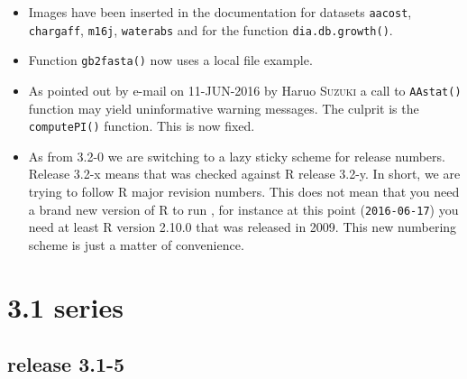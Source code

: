 \documentclass{article}
\begin{document}
\begin{itemize}

\item Images have been inserted in the documentation for datasets
\texttt{aacost}, \texttt{chargaff}, \texttt{m16j}, \texttt{waterabs} 
and for the function \texttt{dia.db.growth()}.

\item Function \texttt{gb2fasta()} now uses a local file example.

\item As pointed out by e-mail on 11-JUN-2016 by Haruo \textsc{Suzuki} a
call to \texttt{AAstat()} function may yield uninformative warning
messages. The culprit is the \texttt{computePI()} function. This
is now fixed.
  
\item As from \seqinr{} 3.2-0 we are switching to a lazy sticky
scheme for \seqinr{} release numbers. Release 3.2-x means that
\seqinr{} was checked against R release 3.2-y. In short, we are
trying to follow R major revision numbers. This does not mean
that you need a brand new version of R to run \seqinr{}, for
instance at this point (\texttt{2016-06-17}) you need at least
R version 2.10.0 that was released in 2009. This new numbering
scheme is just a matter of convenience.

\end{itemize}


\section*{3.1 series}

\subsection*{release 3.1-5}
\end{document}
